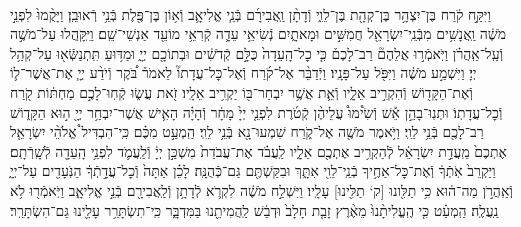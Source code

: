 \documentclass[twoside, openany, parskip=half, 11pt]{book}
\begin{document}
\begin{footnotesize}
\begin{multicols}{2}
\\
וַיִּקַּ֣ח קֹ֔רַח בֶּן־יִצְהָ֥ר בֶּן־קְהָ֖ת בֶּן־לֵוִ֑י וְֿדָתָ֨ן וַֽאֲבִירָ֜ם בְּֿנֵ֧י אֱלִיאָ֛ב וְֿא֥וֹן בֶּן־פֶּ֖לֶת בְּֿנֵ֥י רְֿאוּבֵֽן׃ וַיָּקֻ֨מוּ֙ לִפְנֵ֣י מֹשֶׁ֔ה וַֽאֲנָשִׁ֥ים מִבְּֿנֵֽי־יִשְׂרָאֵ֖ל חֲמִשִּׁ֣ים וּמָאתָ֑יִם נְֿשִׂיאֵ֥י עֵדָ֛ה קְֿרִאֵ֥י מוֹעֵ֖ד אַנְשֵׁי־שֵֽׁם׃ וַיִּֽקָּֽהֲלוּ עַל־מֹשֶׁ֣ה וְֿעַֽל־אַֽהֲרֹ֗ן וַיֹּֽאמְֿר֣וּ אֲלֵהֶם֘ רַב־לָכֶם֒ כִּ֤י כׇל־הָֽעֵדָה֙ כֻּלָּ֣ם קְֿדֹשִׁ֔ים וּבְתוֹכָ֖ם יְיָ֑ וּמַדּ֥וּעַ תִּֽתְנַשְּֿׂא֖וּ עַל־קְהַ֥ל יְיָ׃  וַיִּשְׁמַ֣ע מֹשֶׁ֔ה וַיִּפֹּ֖ל עַל־פָּנָֽיו׃ וַיְֿדַבֵּ֨ר אֶל־קֹ֜רַח וְֿאֶל־כׇּל־עֲדָתוֹ֘ לֵאמֹר֒ בֹּ֠קֶר וְֿיֹדַ֨ע יְיָ֧ אֶת־אֲשֶׁר־ל֛וֹ וְֿאֶת־הַקָּד֖וֹשׁ וְֿהִקְרִ֣יב אֵלָ֑יו וְֿאֵ֛ת אֲשֶׁ֥ר יִבְחַר־בּ֖וֹ יַקְרִ֥יב אֵלָֽיו׃ זֹ֖את עֲשׂ֑וּ קְֿחֽוּ־לָכֶ֣ם מַחְתּ֔וֹת קֹ֖רַח וְֿכׇל־עֲדָתֽוֹ׃ וּתְנֽוּ־בָהֵ֣ן אֵ֡שׁ וְֿשִׂ֩ימוּ֩ עֲלֵיהֶ֨ן קְֿטֹ֜רֶת לִפְנֵ֤י יְיָ֙ מָחָ֔ר וְֿהָיָ֗ה הָאִ֛ישׁ אֲשֶׁר־יִבְחַ֥ר יְיָ֖ ה֣וּא הַקָּד֑וֹשׁ רַב־לָכֶ֖ם בְּֿנֵ֥י לֵוִֽי׃  וַיֹּ֥אמֶר מֹשֶׁ֖ה אֶל־קֹ֑רַח שִׁמְעוּ־נָ֖א בְּֿנֵ֥י לֵוִֽי׃ הַֽמְעַ֣ט מִכֶּ֗ם כִּֽי־הִבְדִּיל֩ אֱלֹהֵ֨י יִשְׂרָאֵ֤ל אֶתְכֶם֙ מֵֽעֲדַ֣ת יִשְׂרָאֵ֔ל לְֿהַקְרִ֥יב אֶתְכֶ֖ם אֵלָ֑יו לַֽעֲבֹ֗ד אֶת־עֲבֹדַת֙ מִשְׁכַּ֣ן יְיָ֔ וְֿלַֽעֲמֹ֛ד לִפְנֵ֥י הָֽעֵדָ֖ה לְֿשָֽׁרְֿתָֽם׃ וַיַּקְרֵב֙ אֹֽתְֿךָ֔ וְֿאֶת־כׇּל־אַחֶ֥יךָ בְֿנֵֽי־לֵוִ֖י אִתָּ֑ךְ וּבִקַּשְׁתֶּ֖ם גַּם־כְּֿהֻנָּֽה׃ לָכֵ֗ן אַתָּה֙ וְֿכׇל־עֲדָ֣תְֿךָ֔ הַנֹּֽעָדִ֖ים עַל־יְיָ֑ וְֿאַֽהֲרֹ֣ן מַה־ה֔וּא כִּ֥י תַלִּ֖ונוּ [ק‘ תַלִּ֖ינוּ] עָלָֽיו׃ וַיִּשְׁלַ֣ח מֹשֶׁ֔ה לִקְרֹ֛א לְֿדָתָ֥ן וְֿלַֽאֲבִירָ֖ם בְּֿנֵ֣י אֱלִיאָ֑ב וַיֹּֽאמְֿר֖וּ לֹ֥א נַֽעֲלֶֽה׃ הַֽמְעַ֗ט כִּ֤י הֶֽעֱלִיתָ֨נוּ֙ מֵאֶ֨רֶץ זָבַ֤ת חָלָב֙ וּדְבַ֔שׁ לַֽהֲמִיתֵ֖נוּ בַּמִּדְבָּ֑ר כִּֽי־תִשְׂתָּרֵ֥ר עָלֵ֖ינוּ גַּם־הִשְׂתָּרֵֽר׃


\end{multicols}
\end{footnotesize}
\end{document}
